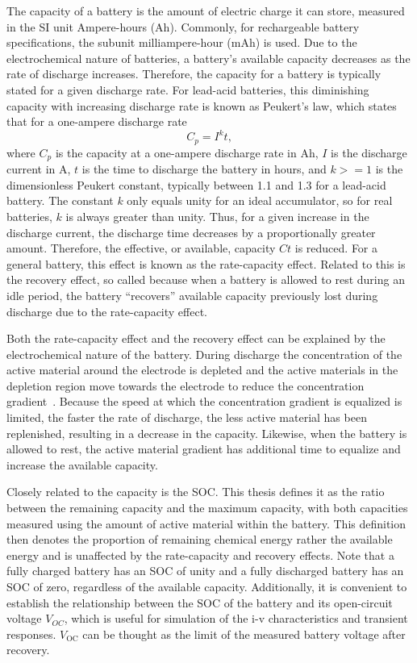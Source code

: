 \documentclass[../zhang_thesis.tex]{subfiles}
\begin{document}
The capacity of a battery is the amount of electric charge it can store, measured in the SI unit Ampere-hours (Ah). Commonly, for rechargeable battery specifications, the subunit milliampere-hour (mAh) is used. Due to the electrochemical nature of batteries, a battery's available capacity decreases as the rate of discharge increases. Therefore, the capacity for a battery is typically stated for a given discharge rate. For lead-acid batteries, this diminishing capacity with increasing discharge rate is known as Peukert's law, which states that for a one-ampere discharge rate~\cite{doerffel06}
\begin{equation}
C_p = I^k t,
\end{equation}
where $C_p$ is the capacity at a one-ampere discharge rate in Ah, $I$ is the discharge current in A, $t$ is the time to discharge the battery in hours, and $k>=1$ is the dimensionless Peukert constant, typically between 1.1 and 1.3 for a lead-acid battery. The constant $k$ only equals unity for an ideal accumulator, so for real batteries, $k$ is always greater than unity. Thus, for a given increase in the discharge current, the discharge time decreases by a proportionally greater amount. Therefore, the effective, or available, capacity $Ct$ is reduced. For a general battery, this effect is known as the rate-capacity effect. Related to this is the recovery effect, so called because when a battery is allowed to rest during an idle period, the battery ``recovers'' available capacity previously lost during discharge due to the rate-capacity effect.

Both the rate-capacity effect and the recovery effect can be explained by the electrochemical nature of the battery. During discharge the concentration of the active material around the electrode is depleted and the active materials in the depletion region move towards the electrode to reduce the concentration gradient~\cite{chiasserini99}. Because the speed at which the concentration gradient is equalized is limited, the faster the rate of discharge, the less active material has been replenished, resulting in a decrease in the capacity. Likewise, when the battery is allowed to rest, the active material gradient has additional time to equalize and increase the available capacity.

Closely related to the capacity is the SOC. This thesis defines it as the ratio between the remaining capacity and the maximum capacity, with both capacities measured using the amount of active material within the battery. This definition then denotes the proportion of remaining chemical energy rather the available energy and is unaffected by the rate-capacity and recovery effects. Note that a fully charged battery has an SOC of unity and a fully discharged battery has an SOC of
zero, regardless of the available capacity. Additionally, it is convenient to establish the relationship between the SOC of the battery and its open-circuit voltage $V_{OC}$, which is useful for simulation of the i-v characteristics and transient responses. $V_\text{OC}$ can be thought as the limit of the measured battery voltage after recovery.
\end{document}
